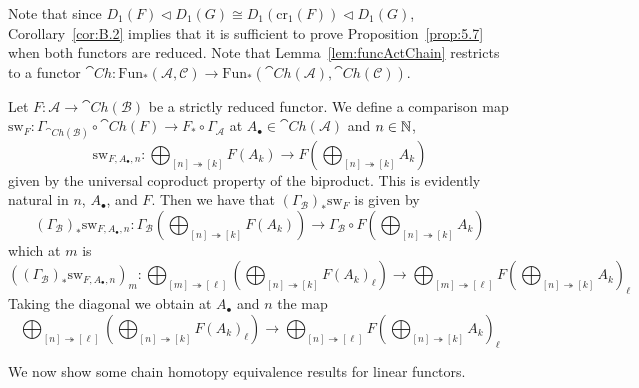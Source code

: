 Note that since $D_1(F)\lhd D_1(G)\cong D_1(\text{cr}_1(F))\lhd D_1(G)$, Corollary~\ref{cor:B.2} implies that it is sufficient to prove Proposition~\ref{prop:5.7} when both functors are reduced. Note that Lemma~\ref{lem:funcActChain} restricts to a functor $\cat{Ch}:\text{Fun}_*(\mathcal{A},\mathcal{C})\to \text{Fun}_*(\cat{Ch}(\mathcal{A}),\cat{Ch}(\mathcal{C}))$. 


\begin{rmk}
    Let $F:\mathcal{A}\to \cat{Ch}(\mathcal{B})$ be a strictly reduced functor. We define a comparison map $\text{sw}_F:\Gamma_{\cat{Ch}(\mathcal{B})}\circ \cat{Ch}(F)\to F_*\circ \Gamma_\mathcal{A}$ at $A_\bullet \in \cat{Ch}(\mathcal{A})$ and $n \in \mathbb N$,
    \begin{equation*}
        \text{sw}_{F,A_\bullet,n}:\bigoplus_{[n]\twoheadrightarrow [k]}F(A_k)\to F\left(\bigoplus_{[n]\twoheadrightarrow [k]}A_k\right)
    \end{equation*}
    given by the universal coproduct property of the biproduct. This is evidently natural in $n$, $A_\bullet$, and $F$. Then we have that $(\Gamma_{\mathcal{B}})_*\text{sw}_F$ is given by 
    \begin{equation*}
        (\Gamma_{\mathcal{B}})_*\text{sw}_{F,A_\bullet,n}:\Gamma_\mathcal{B}\left(\bigoplus_{[n]\twoheadrightarrow [k]}F(A_k)\right)\to \Gamma_\mathcal{B}\circ F\left(\bigoplus_{[n]\twoheadrightarrow [k]}A_k\right)
    \end{equation*} 
    which at $m$ is
    \begin{equation*}
        ((\Gamma_{\mathcal{B}})_*\text{sw}_{F,A_\bullet,n})_m:\bigoplus_{[m]\twoheadrightarrow[\ell]}\left(\bigoplus_{[n]\twoheadrightarrow [k]}F(A_k)_\ell\right)\to \bigoplus_{[m]\twoheadrightarrow[\ell]}F\left(\bigoplus_{[n]\twoheadrightarrow [k]}A_k\right)_\ell
    \end{equation*}
    Taking the diagonal we obtain at $A_\bullet$ and $n$ the map
    \begin{equation*}
        \bigoplus_{[n]\twoheadrightarrow[\ell]}\left(\bigoplus_{[n]\twoheadrightarrow[k]}F(A_k)_\ell\right) \to \bigoplus_{[n]\twoheadrightarrow[\ell]}F\left(\bigoplus_{[n]\twoheadrightarrow[k]}A_k\right)_\ell
    \end{equation*}
\end{rmk}

We now show some chain homotopy equivalence results for linear functors. 


